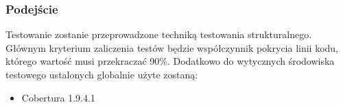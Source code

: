 \subsubsection{Podejście}
Testowanie zostanie przeprowadzone techniką testowania strukturalnego. Głównym
kryterium zaliczenia testów będzie współczynnik pokrycia linii kodu, którego wartość
musi przekraczać 90\%. Dodatkowo do wytycznych środowiska testowego ustalonych
globalnie użyte zostaną:
\begin{itemize}[nosep]
    \item Cobertura 1.9.4.1
\end{itemize}
